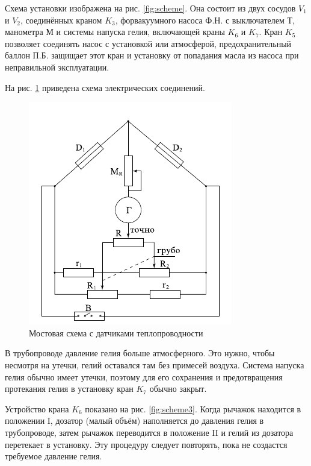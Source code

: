 \documentclass[12pt]{article}
\newcommand{\fref}[1]{рис. \ref{#1}}
\begin{document}
	Схема установки изображена на \fref{fig:scheme}. Она состоит из двух сосудов $V_1$ и $V_2$, соединённых краном $K_3$, форвакуумного насоса Ф.Н. с выключателем Т, манометра М и системы напуска гелия, включающей краны $K_6$ и $K_7$. Кран $K_5$ позволяет соединять насос с установкой или атмосферой, предохранительный баллон П.Б. защищает этот кран и установку от попадания масла из насоса при неправильной эксплуатации.
	
	На \fref{fig:scheme2} приведена схема электрических соединений.
	
	\begin{figure}[h!]
	\caption{Мостовая схема с датчиками теплопроводности}
	\label{fig:scheme2}
	\begin{center}
	\includegraphics[scale=.6]{scheme2.png}
	\end{center}
	\end{figure}
	
	В трубопроводе давление гелия больше атмосферного. Это нужно, чтобы несмотря на утечки, гелий оставался там без примесей воздуха. Система напуска гелия обычно имеет утечки, поэтому для его сохранения и предотвращения протекания гелия в установку кран $K_7$ обычно закрыт.
	
	Устройство крана $K_6$ показано на \fref{fig:scheme3}. Когда рычажок находится в положении I, дозатор (малый объём) наполняется до давления гелия в трубопроводе, затем рычажок переводится в положение II и гелий из дозатора перетекает в установку. Эту процедуру следует повторять, пока не создастся требуемое давление гелия.
	
\end{document}
